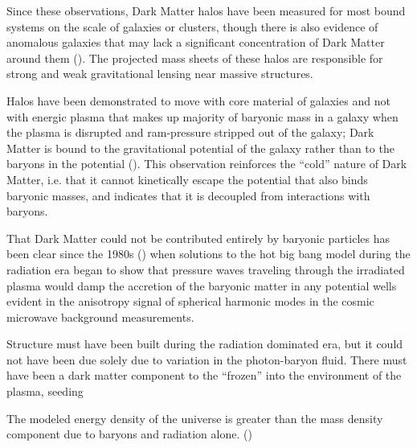 \documentclass{paper}
\begin{document}
  Since these observations, Dark Matter halos have been measured for most 
  bound systems on the scale of galaxies or clusters, though there is also
  evidence of anomalous galaxies that may lack a significant concentration
  of Dark Matter around them (\cite{10.1093/mnras/stab3491}). The projected
  mass sheets of these halos are responsible for strong and weak gravitational 
  lensing near massive structures.

  Halos have been demonstrated to move with core material of galaxies and not 
  with energic plasma that makes up majority of baryonic mass in a galaxy when 
  the plasma is disrupted and ram-pressure stripped out of the galaxy; 
  Dark Matter is bound to the gravitational potential of the galaxy rather 
  than to the baryons in the potential (\cite{Clowe_2006}). This observation 
  reinforces the ``cold'' nature of Dark Matter, i.e. that it cannot 
  kinetically escape the potential that also binds baryonic masses, and 
  indicates that it is decoupled from interactions with baryons. 

  That Dark Matter could not be contributed entirely by baryonic particles
  has been clear since the 1980s (\cite{liddle2015introduction}) when
  solutions to the hot big bang model during the radiation era began to show
  that pressure waves traveling through the irradiated plasma would damp the
  accretion of the baryonic matter in any potential wells evident in the 
  anisotropy signal of spherical harmonic modes in the cosmic microwave 
  background measurements.

  Structure must have been built during the radiation dominated era, but it
  could not have been due solely due to variation in the photon-baryon fluid.
  There must have been a dark matter component to the ``frozen'' into the
  environment of the plasma, seeding 

  


  The modeled energy density of the universe is greater than the mass density
  component due to baryons and radiation alone. 
  (\cite{Clowe_2006})
\end{document}

